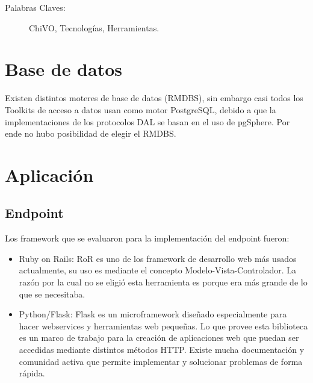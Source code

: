 \documentclass[10pt]{article}
\title{
\center{\small{FONDEF D11I1060} \\}
\center{\textbf{Tecnologías usadas en ChiVO} \\}
\author{Mauricio Solar, Jonathan Antognini.}
\date{Valparaíso, \today}
}
\newenvironment{keywords}{\begin{description}\item[Palabras Claves:]}{\end{description}}
\begin{document}
\maketitle

\begin{abstract}
\begin{center}
	El presente documento detalla las Tecnologías y Herramientas usadas en el desarrollo de ChiVO.
\end{center}
\end{abstract}

\vspace{1cm}
\begin{keywords}
	ChiVO, Tecnologías, Herramientas.
\end{keywords}

\vspace{0.5cm}
\section{Base de datos}

Existen distintos moteres de base de datos (RMDBS), sin embargo casi todos los Toolkits de acceso a datos usan como motor PostgreSQL, debido a que la implementaciones de los protocolos DAL se basan en el uso de pgSphere. Por ende no hubo posibilidad de elegir el RMDBS.

\section{Aplicación}
\subsection{Endpoint}
Los framework que se evaluaron para la implementación del endpoint fueron:
\begin{itemize}
	\item Ruby on Rails: RoR es uno de los framework de desarrollo web más usados actualmente, su uso es mediante el concepto Modelo-Vista-Controlador. La razón por la cual no se eligió esta herramienta es porque era más grande de lo que se necesitaba.
	\item Python/Flask: Flask es un microframework diseñado especialmente para hacer webservices y herramientas web pequeñas. Lo que provee esta biblioteca es un marco de trabajo para la creación de aplicaciones web que puedan ser accedidas mediante distintos métodos HTTP. Existe mucha documentación y comunidad activa que permite implementar y solucionar problemas de forma rápida.
\end{itemize}
\end{document}
